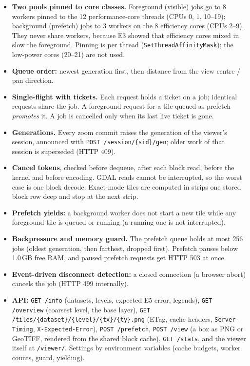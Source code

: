 ﻿\documentclass[11pt,a4paper]{article}
\newcommand{\code}[1]{\texttt{#1}}
\begin{document}
\begin{itemize}
  \item \textbf{Two pools pinned to core classes.} Foreground (visible) jobs go to 8 workers pinned to the 12
  performance-core threads (CPUs 0, 1, 10--19); background (prefetch) jobs to 3 workers on the 8 efficiency cores (CPUs
  2--9). They never share workers, because E3 showed that efficiency cores mixed in slow the foreground. Pinning is per
  thread (\code{SetThreadAffinityMask}); the low-power cores (20--21) are not used.
  \item \textbf{Queue order:} newest generation first, then distance from the view centre / pan direction.
  \item \textbf{Single-flight with tickets.} Each request holds a ticket on a job; identical requests share the job. A
  foreground request for a tile queued as prefetch \emph{promotes} it. A job is cancelled only when its last live ticket
  is gone.
  \item \textbf{Generations.} Every zoom commit raises the generation of the viewer's session, announced with
  \code{POST /session/\{sid\}/gen}; older work of that session is superseded (HTTP 409).
  \item \textbf{Cancel tokens}, checked before dequeue, after each block read, before the kernel and before encoding.
  GDAL reads cannot be interrupted, so the worst case is one block decode. Exact-mode tiles are computed in strips one
  stored block row deep and stop at the next strip.
  \item \textbf{Prefetch yields:} a background worker does not start a new tile while any foreground tile is queued or
  running (a running one is not interrupted).
  \item \textbf{Backpressure and memory guard.} The prefetch queue holds at most 256 jobs (oldest generation, then
  farthest, dropped first). Prefetch pauses below 1.0\,GB free RAM, and paused prefetch requests get HTTP 503 at once.
  \item \textbf{Event-driven disconnect detection:} a closed connection (a browser abort) cancels the job (HTTP 499
  internally).
  \item \textbf{API:} \code{GET /info} (datasets, levels, expected E5 error, legends), \code{GET /overview} (coarsest level,
  the base layer), \code{GET /tiles/\{dataset\}/\{level\}/\{tx\}/\{ty\}.png} (ETag, cache headers, \code{Server-Timing},
  \code{X-Expected-Error}), \code{POST /prefetch}, \code{POST /view} (a box as PNG or GeoTIFF, rendered from the shared
  block cache), \code{GET /stats}, and the viewer itself at \code{/viewer/}. Settings by environment variables
  (cache budgets, worker counts, guard, yielding).
\end{itemize}
\end{document}
